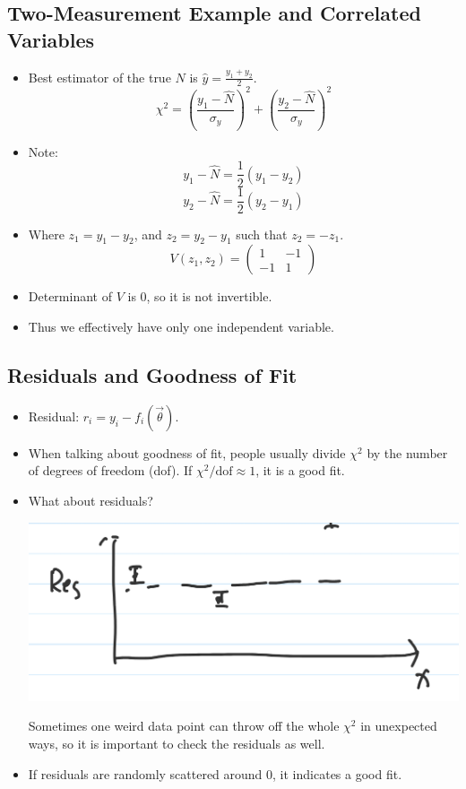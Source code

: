 \subsection{Two-Measurement Example and Correlated Variables}

\begin{itemize}
    \item Best estimator of the true $N$ is $\hat{y} = \frac{y_1 + y_2}{2}$.
          \[
              \chi^2 = \left( \frac{y_1 - \hat{N}}{\sigma_y} \right)^2 +
              \left( \frac{y_2 - \hat{N}}{\sigma_y} \right)^2
          \]
    \item Note:
          \[
              y_1 - \hat{N} = \frac{1}{2} (y_1 - y_2)
          \]
          \[
              y_2 - \hat{N} = \frac{1}{2} (y_2 - y_1)
          \]
    \item Where $z_1 = y_1 - y_2$, and $z_2 = y_2 - y_1$ such that $z_2 = -z_1$.
          \[
              V(z_1, z_2) =
              \begin{pmatrix}
                  1  & -1 \\
                  -1 & 1
              \end{pmatrix}
          \]
    \item Determinant of $V$ is 0, so it is not invertible.
    \item Thus we effectively have only one independent variable.
\end{itemize}

\subsection{Residuals and Goodness of Fit}

\begin{itemize}
    \item Residual: $r_i = y_i - f_i(\vec{\theta})$.
    \item When talking about goodness of fit, people usually divide $\chi^2$ by the number of degrees of freedom (dof). If $\chi^2/\text{dof} \approx 1$, it is a good fit.
    \item What about residuals?

          \includegraphics[width=0.5\linewidth]{Images/lec11-residual.png}

          Sometimes one weird data point can throw off the whole $\chi^2$ in unexpected ways, so it is important to check the residuals as well.
    \item If residuals are randomly scattered around 0, it indicates a good fit.
\end{itemize}

